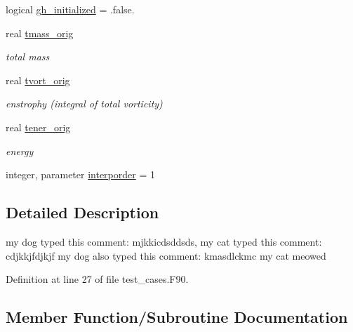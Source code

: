 \begin{DoxyCompactItemize}
\item 
logical \hyperlink{classtest__cases__mod_aacf71cede68445436888a520c4713a3c}{gh\-\_\-initialized} = .false.
\item 
real \hyperlink{classtest__cases__mod_af40da1fd7e6753224232eb5f50752dbf}{tmass\-\_\-orig}
\begin{DoxyCompactList}\small\item\em total mass \end{DoxyCompactList}\item 
real \hyperlink{classtest__cases__mod_a9e6b5dada32091330827cadf573e240a}{tvort\-\_\-orig}
\begin{DoxyCompactList}\small\item\em enstrophy (integral of total vorticity) \end{DoxyCompactList}\item 
real \hyperlink{classtest__cases__mod_a2a10be3be35d2f512f6e3b83652672eb}{tener\-\_\-orig}
\begin{DoxyCompactList}\small\item\em energy \end{DoxyCompactList}\item 
integer, parameter \hyperlink{classtest__cases__mod_ab921cb10723bbe2b3c15e81b664f5ff6}{interporder} = 1
\end{DoxyCompactItemize}


\subsection{Detailed Description}
my dog typed this comment\-: mjkkicdsddsds, my cat typed this comment\-: cdjkkjfdjkjf my dog also typed this comment\-: kmasdlckmc my cat meowed 

Definition at line 27 of file test\-\_\-cases.\-F90.



\subsection{Member Function/\-Subroutine Documentation}
